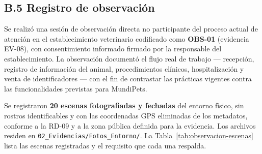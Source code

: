 \documentclass[journal,onecolumn]{IEEEtran}
\begin{document}
	
	\subsection*{B.5 Registro de observación}
	
	Se realizó una sesión de observación directa no participante del proceso
	actual de atención en el establecimiento veterinario codificado como
	\textbf{OBS-01} (evidencia EV-08), con consentimiento informado firmado por
	la responsable del establecimiento. La observación documentó el flujo real de
	trabajo --- recepción, registro de información del animal, procedimientos
	clínicos, hospitalización y venta de identificadores --- con el fin de
	contrastar las prácticas vigentes contra las funcionalidades previstas para
	MundiPets.
	
	Se registraron \textbf{20 escenas fotografiadas y fechadas} del entorno
	físico, sin rostros identificables y con las coordenadas GPS eliminadas de
	los metadatos, conforme a la RD-09 y a la zona pública definida para la
	evidencia. Los archivos residen en
	\texttt{02\_Evidencias/Fotos\_Entorno/}. La
	Tabla~\ref{tab:observacion-escenas} lista las escenas registradas y el
	requisito que cada una respalda.
	
\end{document}
